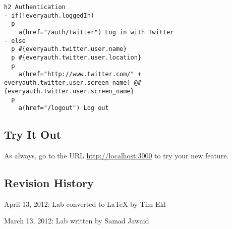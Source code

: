 \documentclass{article}
\begin{document}
\begin{verbatim}
h2 Authentication
- if(!everyauth.loggedIn)
  p
    a(href="/auth/twitter") Log in with Twitter
- else
  p #{everyauth.twitter.user.name}
  p #{everyauth.twitter.user.location}
  p
    a(href="http://www.twitter.com/" + everyauth.twitter.user.screen_name) @#{everyauth.twitter.user.screen_name}
  p
    a(href="/logout") Log out
\end{verbatim}

\subsection*{Try It Out}

As always, go to the URL \href{http://localhost:3000/}{http://localhost:3000} to try your new feature.



\subsection*{Revision History}
\begin{itemize*}
\item April 13, 2012: Lab converted to LaTeX by Tim Ekl
\item March 13, 2012: Lab written by Samad Jawaid
\end{itemize*}
\end{document}
